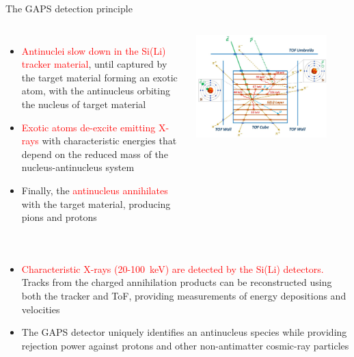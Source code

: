 \documentclass[aspectratio=169,xcolor=dvipsnames]{beamer} %
\begin{document}
\begin{frame}{The GAPS detection principle}
    \fontsize{9pt}{1}\selectfont
    \begin{columns}
            \begin{itemize}
                \setlength\itemsep{1em}
                \item \textcolor{Red}{Antinuclei slow down in the Si(Li) tracker material}, until captured by the target material forming an exotic atom, with the antinucleus orbiting the nucleus of target material
                \item \textcolor{Red}{Exotic atoms de-excite emitting X-rays} with characteristic energies that depend on the reduced mass of the nucleus-antinucleus system
                \item Finally, the \textcolor{Red}{antinucleus annihilates} with the target material, producing pions and protons
            \end{itemize}

            \centering
            \includegraphics[width=0.85\textwidth]{images/backup_slides/tracker_scheme_manghisoni.jpg}
    \end{columns}

    \vspace{0.1cm}
    \begin{columns}
            \begin{itemize}
                \item \textcolor{Red}{Characteristic X-rays (20-\SI{100}{\kilo\electronvolt}) are detected by the Si(Li) detectors.} Tracks from the charged annihilation products can be reconstructed using both the tracker and ToF, providing measurements of energy depositions and velocities
                \item The GAPS detector uniquely identifies an antinucleus species while providing rejection power against protons and other non-antimatter cosmic-ray particles
            \end{itemize}
    \end{columns}
\end{frame}
\end{document}
